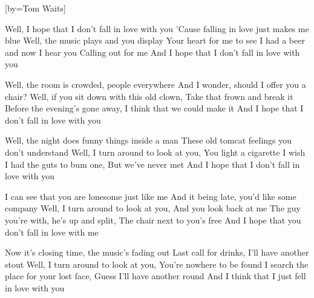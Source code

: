 [by={Tom Waits}]


  \chordsoff

  \beginverse
  Well, I hope that I don't fall in love with you
  'Cause falling in love just makes me blue
  Well, the music plays and you display
  Your heart for me to see
  I had a beer and now I hear you
  Calling out for me
  And I hope that I don't fall in love with you
  \endverse

  \beginverse
  Well, the room is crowded, people everywhere
  And I wonder, should I offer you a chair?
  Well, if you sit down with this old clown,
  Take that frown and break it
  Before the evening's gone away,
  I think that we could make it
  And I hope that I don't fall in love with you
  \endverse

  \beginverse
  Well, the night does funny things inside a man
  These old tomcat feelings you don't understand
  Well, I turn around to look at you,
  You light a cigarette
  I wish I had the guts to bum one,
  But we've never met
  And I hope that I don't fall in love with you
  \endverse

  \beginverse
  I can see that you are lonesome just like me
  And it being late, you'd like some company
  Well, I turn around to look at you,
  And you look back at me
  The guy you're with, he's up and split,
  The chair next to you's free
  And I hope that you don't fall in love with me
  \endverse

  \beginverse
  Now it's closing time, the music's fading out
  Last call for drinks, I'll have another stout
  Well, I turn around to look at you,
  You're nowhere to be found
  I search the place for your lost face,
  Guess I'll have another round
  And I think that I just fell in love with you
  \endverse

\endsong
